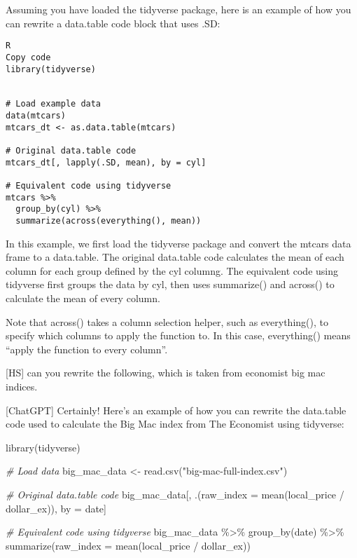 \documentclass[
]{bxjsbook}
\newenvironment{Shaded}{\begin{snugshade}}{\end{snugshade}}
\newcommand{\AttributeTok}[1]{\textcolor[rgb]{0.77,0.63,0.00}{#1}}
\newcommand{\CommentTok}[1]{\textcolor[rgb]{0.56,0.35,0.01}{\textit{#1}}}
\newcommand{\FunctionTok}[1]{\textcolor[rgb]{0.00,0.00,0.00}{#1}}
\newcommand{\NormalTok}[1]{#1}
\newcommand{\OtherTok}[1]{\textcolor[rgb]{0.56,0.35,0.01}{#1}}
\newcommand{\SpecialCharTok}[1]{\textcolor[rgb]{0.00,0.00,0.00}{#1}}
\newcommand{\StringTok}[1]{\textcolor[rgb]{0.31,0.60,0.02}{#1}}
\theoremstyle{definition}
\theoremstyle{definition}
\theoremstyle{definition}
\theoremstyle{definition}
\theoremstyle{remark}
\begin{document}
Assuming you have loaded the tidyverse package, here is an example of how you can rewrite a data.table code block that uses .SD:

\begin{verbatim}
R
Copy code
library(tidyverse)


# Load example data
data(mtcars)
mtcars_dt <- as.data.table(mtcars)

# Original data.table code
mtcars_dt[, lapply(.SD, mean), by = cyl]

# Equivalent code using tidyverse
mtcars %>%
  group_by(cyl) %>%
  summarize(across(everything(), mean))
\end{verbatim}

In this example, we first load the tidyverse package and convert the mtcars data frame to a data.table. The original data.table code calculates the mean of each column for each group defined by the cyl columng. The equivalent code using tidyverse first groups the data by cyl, then uses summarize() and across() to calculate the mean of every column.

Note that across() takes a column selection helper, such as everything(), to specify which columns to apply the function to. In this case, everything() means ``apply the function to every column''.

{[}HS{]} can you rewrite the following, which is taken from economist big mac indices.

{[}ChatGPT{]} Certainly! Here's an example of how you can rewrite the data.table code used to calculate the Big Mac index from The Economist using tidyverse:

\begin{Shaded}
\begin{Highlighting}[]
\FunctionTok{library}\NormalTok{(tidyverse)}

\CommentTok{\# Load data}
\NormalTok{big\_mac\_data }\OtherTok{\textless{}{-}} \FunctionTok{read.csv}\NormalTok{(}\StringTok{"big{-}mac{-}full{-}index.csv"}\NormalTok{)}

\CommentTok{\# Original data.table code}
\NormalTok{big\_mac\_data[, .(}\AttributeTok{raw\_index =} \FunctionTok{mean}\NormalTok{(local\_price }\SpecialCharTok{/}\NormalTok{ dollar\_ex)), by }\OtherTok{=}\NormalTok{ date]}

\CommentTok{\# Equivalent code using tidyverse}
\NormalTok{big\_mac\_data }\SpecialCharTok{\%\textgreater{}\%}
  \FunctionTok{group\_by}\NormalTok{(date) }\SpecialCharTok{\%\textgreater{}\%}
  \FunctionTok{summarize}\NormalTok{(}\AttributeTok{raw\_index =} \FunctionTok{mean}\NormalTok{(local\_price }\SpecialCharTok{/}\NormalTok{ dollar\_ex))}
\end{Highlighting}
\end{Shaded}
\end{document}
